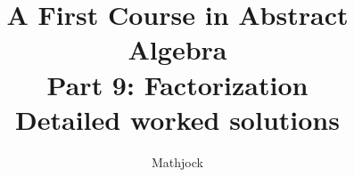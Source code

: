 
\title{\textbf{A First Course in Abstract Algebra}\\[0.3em]Part 9: Factorization\\[0.3em]\large Detailed worked solutions}
\author{Mathjock}
\date{}

\maketitle
\bookinfo
\tableofcontents
\clearpage
\renewcommand{\thesection}{45}
\renewcommand{\theHsection}{fraleigh.45}

\clearpage
\renewcommand{\thesection}{46}
\renewcommand{\theHsection}{fraleigh.46}

\clearpage
\renewcommand{\thesection}{47}
\renewcommand{\theHsection}{fraleigh.47}


